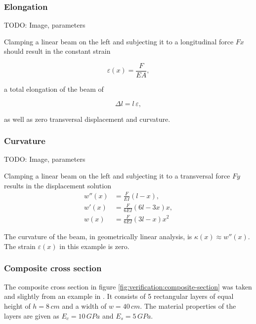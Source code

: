 \subsubsection*{Elongation}

TODO: Image, parameters

Clamping a linear beam on the left and subjecting it to a longitudinal force $Fx$ should result in the constant strain

\begin{equation}
\varepsilon(x) = \frac{F}{EA},
\end{equation}

a total elongation of the beam of

\begin{equation}
\Delta l = l\,\varepsilon,
\end{equation}

as well as zero transversal displacement and curvature.

\subsubsection*{Curvature}

TODO: Image, parameters

Clamping a linear beam on the left and subjecting it to a transversal force $Fy$ results in the displacement solution
%
\begin{align*}
w''(x) &= \frac{F}{EI}(l - x), \\
w'(x) &= \frac{F}{6EI}(6l - 3x)x, \\
w(x) &= \frac{F}{6EI}(3l - x)x^2
\end{align*}

The curvature of the beam, in geometrically linear analysis, is $\kappa(x) \approx w''(x)$.
The strain $\varepsilon(x)$ in this example is zero.

\newpage
\subsubsection*{Composite cross section}

The composite cross section in figure \ref{fig:verification:composite-section} was taken and slightly from an example in \cite{bib:tm2}.
It consists of 5 rectangular layers of equal height of $h = 8\,\unit{cm}$ and a width of $w = 40\,\unit{cm}$.
The material properties of the layers are given as $E_{c} = 10\,\unit{GPa}$ and $E_{s} = 5\,\unit{GPa}$.

